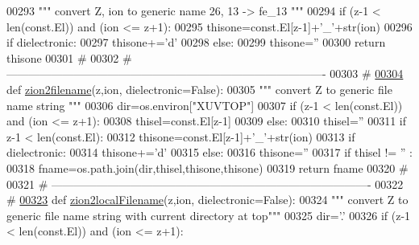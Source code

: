 \begin{DoxyCode}
{{{{00293     \textcolor{stringliteral}{""" convert Z, ion to generic name  26, 13 -> fe\_13 """}
00294     \textcolor{keywordflow}{if} (z-1 < len(const.El)) \textcolor{keywordflow}{and} (ion <= z+1):
00295         thisone=const.El[z-1]+\textcolor{stringliteral}{'\_'}+str(ion)
00296         \textcolor{keywordflow}{if} dielectronic:
00297             thisone+=\textcolor{stringliteral}{'d'}
00298     \textcolor{keywordflow}{else}:
00299         thisone=\textcolor{stringliteral}{''}
00300     \textcolor{keywordflow}{return} thisone
00301     \textcolor{comment}{#}
00302     \textcolor{comment}{# -------------------------------------------------------------------------------------}
00303     \textcolor{comment}{#}
\hypertarget{__chianti__tools_8py_source_l00304}{}\hyperlink{namespacepyneb_1_1utils_1_1__chianti__tools_a46370e972711f8737755fa9c8fb57ed8}{00304} \textcolor{keyword}{def }\hyperlink{namespacepyneb_1_1utils_1_1__chianti__tools_a46370e972711f8737755fa9c8fb57ed8}{zion2filename}(z,ion, dielectronic=False):
00305     \textcolor{stringliteral}{""" convert Z to generic file name string """}
00306     dir=os.environ[\textcolor{stringliteral}{"XUVTOP"}]
00307     \textcolor{keywordflow}{if} (z-1 < len(const.El)) \textcolor{keywordflow}{and} (ion <= z+1):
00308         thisel=const.El[z-1]
00309     \textcolor{keywordflow}{else}:
00310         thisel=\textcolor{stringliteral}{''}
00311     \textcolor{keywordflow}{if} z-1 < len(const.El):
00312         thisone=const.El[z-1]+\textcolor{stringliteral}{'\_'}+str(ion)
00313         \textcolor{keywordflow}{if} dielectronic:
00314             thisone+=\textcolor{stringliteral}{'d'}
00315     \textcolor{keywordflow}{else}:
00316         thisone=\textcolor{stringliteral}{''}
00317     \textcolor{keywordflow}{if} thisel != \textcolor{stringliteral}{''} :
00318         fname=os.path.join(dir,thisel,thisone,thisone)
00319     \textcolor{keywordflow}{return} fname
00320     \textcolor{comment}{#}
00321     \textcolor{comment}{# -------------------------------------------------------------------------------------}
00322     \textcolor{comment}{#}
\hypertarget{__chianti__tools_8py_source_l00323}{}\hyperlink{namespacepyneb_1_1utils_1_1__chianti__tools_aa1c272dcccda8670d22cf866cd0e9b5f}{00323} \textcolor{keyword}{def }\hyperlink{namespacepyneb_1_1utils_1_1__chianti__tools_aa1c272dcccda8670d22cf866cd0e9b5f}{zion2localFilename}(z,ion, dielectronic=False):
00324     \textcolor{stringliteral}{""" convert Z to generic file name string with current directory at top"""}
00325     dir=\textcolor{stringliteral}{'.'}
00326     \textcolor{keywordflow}{if} (z-1 < len(const.El)) \textcolor{keywordflow}{and} (ion <= z+1):
}}}}
\end{DoxyCode}

